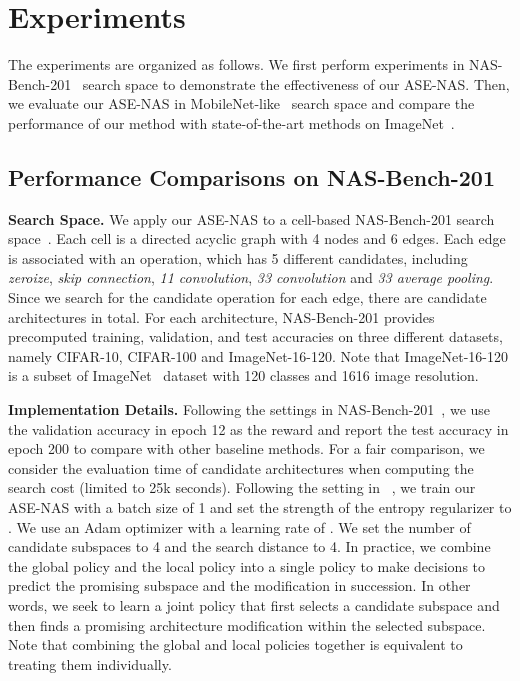 \documentclass[lettersize,journal]{IEEEtran}
\newcommand{\sexyname}{ASE-NAS\xspace}
\begin{document}
\section{Experiments}

The experiments are organized as follows.
We first perform experiments in NAS-Bench-201~\cite{dong2020nasbench201} search space to demonstrate the effectiveness of our \sexyname.
Then, we evaluate our \sexyname in MobileNet-like~\cite{howard2019searching} search space and compare the performance of our method with state-of-the-art methods on ImageNet~\cite{deng2009imagenet}.

\subsection{Performance Comparisons on NAS-Bench-201}

\textbf{Search Space.}
We apply our \sexyname to a cell-based NAS-Bench-201 search space~\cite{dong2020nasbench201}.
Each cell is a directed acyclic graph with 4 nodes and 6 edges.
Each edge is associated with an operation, which has 5 different candidates, including \textit{zeroize}, \textit{skip connection}, \textit{11 convolution}, \textit{33 convolution} and \textit{33 average pooling}.
Since we search for the candidate operation for each edge, there are  candidate architectures in total.
For each architecture, NAS-Bench-201 provides precomputed training, validation, and test accuracies on three different datasets, namely CIFAR-10, CIFAR-100 and ImageNet-16-120. Note that ImageNet-16-120 is a subset of ImageNet~\cite{deng2009imagenet} dataset with 120 classes and 1616 image resolution.

\textbf{Implementation Details.}
Following the settings in NAS-Bench-201~\cite{dong2020nasbench201}, we use the validation accuracy in epoch 12 as the reward and report the test accuracy in epoch 200 to compare with other baseline methods.
For a fair comparison, we consider the evaluation time of candidate architectures when computing the search cost (limited to 25k seconds).
Following the setting in ~\cite{pham2018efficient}, we train our \sexyname with a batch size of 1 and set the strength of the entropy regularizer to .
We use an Adam optimizer with a learning rate of .
We set the number of candidate subspaces  to 4 and the search distance  to 4.
In practice, we combine the global policy  and the local policy  into a single policy to make decisions to predict the promising subspace  and the modification  in succession.
In other words, we seek to learn a joint policy that first selects a candidate subspace and then finds a promising architecture modification within the selected subspace.
Note that combining the global and local policies together is equivalent to treating them individually.
\end{document}
